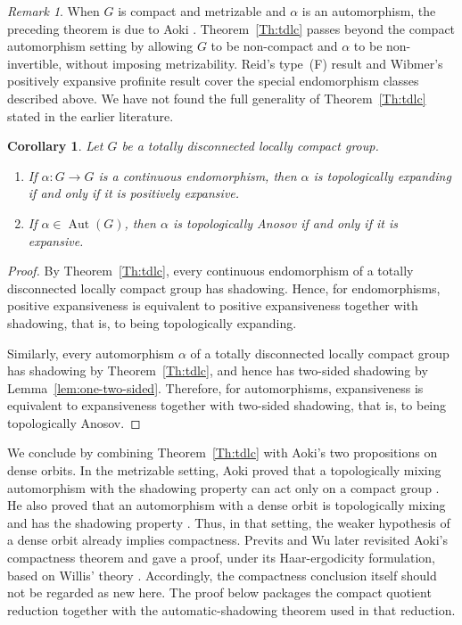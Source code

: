 \documentclass[12pt]{amsart}
\newtheorem{corollary}[theorem]{Corollary}
\theoremstyle{definition}
\numberwithin{equation}{section}
\theoremstyle{remark}
\newtheorem{remark}[theorem]{Remark}
\begin{document}
\begin{remark}\label{rem:Aoki-automatic-shadowing}
When $G$ is compact and metrizable and $\alpha$ is an automorphism, the
preceding theorem is due to Aoki
\cite[Application~2, pp.~170--172]{AokiSplitting1985}.
Theorem~\ref{Th:tdlc}
passes beyond the compact automorphism setting by allowing $G$ to be
non-compact and $\alpha$ to be non-invertible, without imposing
metrizability. Reid's type~(F) result and
Wibmer's positively expansive profinite result cover the special
endomorphism classes described above. We have not found the full generality
of Theorem~\ref{Th:tdlc} stated in the earlier literature.
\end{remark}



\begin{corollary}\label{cor:tdlc-expanding-Anosov}
Let $G$ be a totally disconnected locally compact group.
\begin{enumerate}
\item If $\alpha:G\to G$ is a continuous endomorphism, then $\alpha$ is
topologically expanding if and only if it is positively expansive.
\item If $\alpha\in\operatorname{Aut}(G)$, then $\alpha$ is topologically
Anosov if and only if it is expansive.
\end{enumerate}
\end{corollary}

\begin{proof}
By Theorem~\ref{Th:tdlc}, every continuous endomorphism of a totally
disconnected locally compact group has shadowing. Hence, for endomorphisms,
positive expansiveness is equivalent to positive expansiveness together
with shadowing, that is, to being topologically expanding.

Similarly, every automorphism $\alpha$ of a totally disconnected locally
compact group has shadowing by Theorem~\ref{Th:tdlc}, and hence has
two-sided shadowing by Lemma~\ref{lem:one-two-sided}. Therefore, for
automorphisms, expansiveness is equivalent to expansiveness together with
two-sided shadowing, that is, to being topologically Anosov.
\end{proof}


We conclude by combining Theorem~\ref{Th:tdlc} with Aoki's two
propositions on dense orbits. In the metrizable setting, Aoki proved that a
topologically mixing automorphism with the shadowing property
can act only on a compact group \cite[Proposition~3]{AokiDense1985}. He also
proved that an automorphism with a dense orbit is topologically mixing and
has the shadowing property \cite[Proposition~4]{AokiDense1985}. Thus,
in that setting, the weaker hypothesis of a dense orbit already implies
compactness. Previts and Wu later revisited Aoki's compactness theorem and
gave a proof, under its Haar-ergodicity formulation, based on Willis' theory
\cite{PrevitsWu2003}. Accordingly, the compactness conclusion itself should
not be regarded as new here. The proof below packages the compact quotient
reduction together with the automatic-shadowing theorem used in that
reduction.
\end{document}
